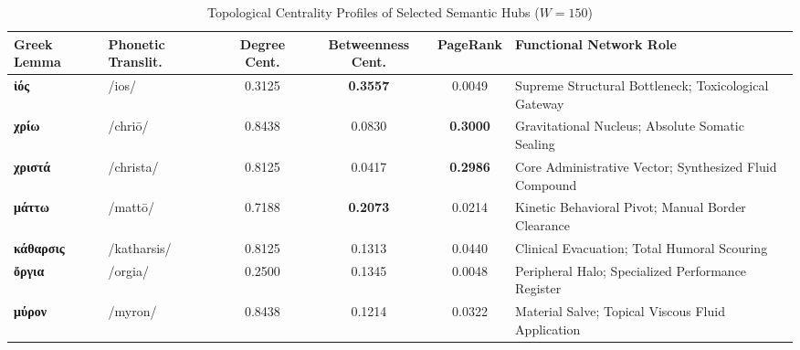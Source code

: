 \documentclass[11pt,twoside,a4paper]{article}
\begin{document}
\begin{table}[h!]
\centering
\small
\caption{Topological Centrality Profiles of Selected Semantic Hubs ($W = 150$)}
\begin{tabular}{llcccm{5.2cm}}
\toprule
\textbf{Greek Lemma} & \textbf{Phonetic Translit.} & \textbf{Degree Cent.} & \textbf{Betweenness Cent.} & \textbf{PageRank} & \textbf{Functional Network Role} \\
\midrule
\textbf{ἰός} & /ios/ & 0.3125 & \textbf{0.3557} & 0.0049 & Supreme Structural Bottleneck; Toxicological Gateway \\
\textbf{χρίω} & /chriō/ & 0.8438 & 0.0830 & \textbf{0.3000} & Gravitational Nucleus; Absolute Somatic Sealing \\
\textbf{χριστά} & /christa/ & 0.8125 & 0.0417 & \textbf{0.2986} & Core Administrative Vector; Synthesized Fluid Compound \\
\textbf{μάττω} & /mattō/ & 0.7188 & \textbf{0.2073} & 0.0214 & Kinetic Behavioral Pivot; Manual Border Clearance \\
\textbf{κάθαρσις} & /katharsis/ & 0.8125 & 0.1313 & 0.0440 & Clinical Evacuation; Total Humoral Scouring \\
\textbf{ὄργια} & /orgia/ & 0.2500 & 0.1345 & 0.0048 & Peripheral Halo; Specialized Performance Register \\
\textbf{μύρον} & /myron/ & 0.8438 & 0.1214 & 0.0322 & Material Salve; Topical Viscous Fluid Application \\
\bottomrule
\end{tabular}
\label{tab:centrality_metrics}
\end{table}
\end{document}
